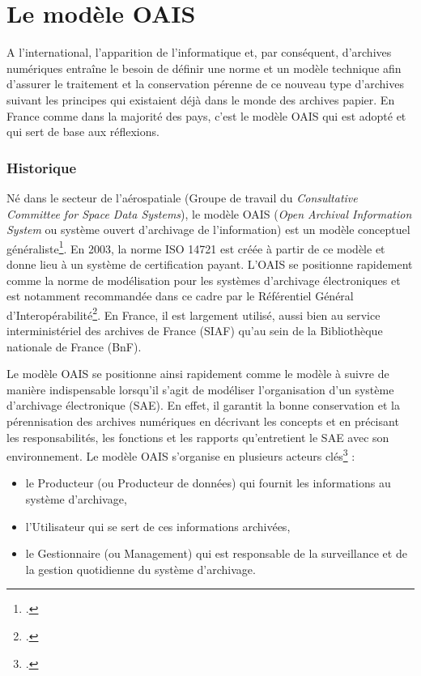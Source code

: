 \chapter{Le modèle OAIS}
	A l’international, l’apparition de l’informatique et, par conséquent, d’archives numériques entraîne le besoin de définir une norme et un modèle technique afin d’assurer le traitement et la conservation pérenne de ce nouveau type d’archives suivant les principes qui existaient déjà dans le monde des archives papier. En France comme dans la majorité des pays, c’est le modèle \gls{OAIS} qui est adopté et qui sert de base aux réflexions.

\subsection{Historique}

Né dans le secteur de l’aérospatiale (Groupe de travail du \textit{Consultative Committee for Space Data Systems}), le modèle \gls{OAIS} (\textit{Open Archival Information System} ou système ouvert d’archivage de l’information) est un modèle conceptuel généraliste\footcite{noauthor_modeet_2023}. En 2003, la norme ISO 14721 est créée à partir de ce modèle et donne lieu à un système de certification payant. L’\gls{OAIS} se positionne rapidement comme la norme de modélisation pour les systèmes d’archivage électroniques et est notamment recommandée dans ce cadre par le Référentiel Général d’Interopérabilité\footcite[pp.43-44]{montel_etude_2018}. En France, il est largement utilisé, aussi bien au service interministériel des archives de France (SIAF) qu’au sein de la Bibliothèque nationale de France (BnF). 


Le modèle \gls{OAIS} se positionne ainsi rapidement comme le modèle à suivre de manière indispensable lorsqu’il s’agit de modéliser l’organisation d’un système d’archivage électronique (SAE). En effet, il garantit la bonne conservation et la pérennisation des archives numériques en décrivant les concepts et en précisant les responsabilités, les fonctions et les rapports qu’entretient le SAE avec son environnement.  
Le modèle \gls{OAIS} s’organise en plusieurs acteurs clés\footcite[pp.28-29]{noauthor_reference_2012} : 
\begin{itemize}
	\item le Producteur (ou Producteur de données) qui fournit les informations au système d'archivage,
	\item l’Utilisateur qui se sert de ces informations archivées,
	\item le Gestionnaire (ou Management) qui est responsable de la surveillance et de la gestion quotidienne du système d'archivage.
\end{itemize}

